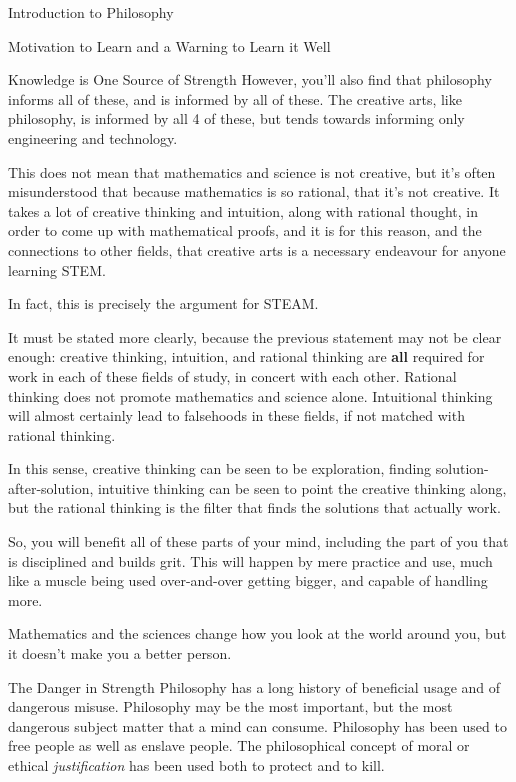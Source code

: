 \begin{chapter}{Introduction to Philosophy}
\begin{section}{Motivation to Learn and a Warning to Learn it Well}
\begin{subsection}{Knowledge is One Source of Strength}
            However, you'll also find that philosophy informs all of these, and is informed by all of these. The creative arts, like philosophy, is informed by all 4 of these, but tends towards informing only engineering and technology.
                
            This does not mean that mathematics and science is not creative, but it's often misunderstood that because mathematics is so rational, that it's not creative. It takes a lot of creative thinking and intuition, along with rational thought, in order to come up with mathematical proofs, and it is for this reason, and the connections to other fields, that creative arts is a necessary endeavour for anyone learning STEM.
                
            In fact, this is precisely the argument for STEAM.
                
            It must be stated more clearly, because the previous statement may not be clear enough: creative thinking, intuition, and rational thinking are \textbf{all} required for work in each of these fields of study, in concert with each other. Rational thinking does not promote mathematics and science alone. Intuitional thinking will almost certainly lead to falsehoods in these fields, if not matched with rational thinking.
                
            In this sense, creative thinking can be seen to be exploration, finding solution-after-solution, intuitive thinking can be seen to point the creative thinking along, but the rational thinking is the filter that finds the solutions that actually work.
                
            So, you will benefit all of these parts of your mind, including the part of you that is disciplined and builds grit. This will happen by mere practice and use, much like a muscle being used over-and-over getting bigger, and capable of handling more.
                
            Mathematics and the sciences change how you look at the world around you, but it doesn't make you a better person.
        \end{subsection}
        
        \begin{subsection}{The Danger in Strength}
            Philosophy has a long history of beneficial usage and of dangerous misuse. Philosophy may be the most important, but the most dangerous subject matter that a mind can consume. Philosophy has been used to free people as well as enslave people. The philosophical concept of moral or ethical \emph{justification} has been used both to protect and to kill.
            

\end{subsection}
\end{section}
\end{chapter}
